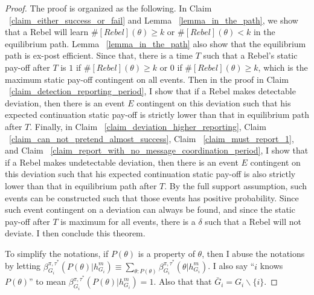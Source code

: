 \documentclass[12pt,letter]{article}
\theoremstyle{definition}
\theoremstyle{remark}
\theoremstyle{claim}
\begin{document}
\begin{proof}
The proof is organized as the following. In Claim ~\ref{claim_either_success_or_fail} and Lemma ~\ref{lemma_in_the_path}, we show that a Rebel will learn $\#[Rebel](\theta)\geq k$ or $\#[Rebel](\theta)< k$ in the equilibrium path. Lemma ~\ref{lemma_in_the_path} also show that the equilibrium path is ex-post efficient. Since that, there is a time $T$ such that a Rebel's static pay-off after $T$ is $1$ if $\#[Rebel](\theta)\geq k$ or $0$ if $\#[Rebel](\theta)\geq k$, which is the maximum static pay-off contingent on all events. Then in the proof in Claim ~\ref{claim_detection_reporting_period}, I show that if a Rebel makes detectable deviation, then there is an event $E$ contingent on this deviation such that his expected continuation static pay-off is strictly lower than that in equilibrium path after $T$. Finally, in Claim ~\ref{claim_deviation_higher_reporting}, Claim ~\ref{claim_can_not_pretend_almost_success}, Claim ~\ref{claim_must_report_1}, and Claim ~\ref{claim_report_with_no_message_coordination_period}, I show that if a Rebel makes undetectable deviation, then there is an event $E$ contingent on this deviation such that his expected continuation static pay-off is also strictly lower than that in equilibrium path after $T$. By the full support assumption, such events can be constructed such that those events has positive probability. Since such event contingent on a deviation can always be found, and since the static pay-off after $T$ is maximum for all events, there is a $\delta$ such that a Rebel will not deviate. I then conclude this theorem.

To simplify the notations, if $P(\theta)$ is a property of $\theta$, then I abuse the notations by letting $\beta^{\pi,\tau^*}_{G_i}(P(\theta)|h^{m}_{G_i})\equiv \sum_{\theta:P(\theta)}\beta^{\pi,\tau^*}_{G_i}(\theta|h^{m}_{G_i})$. I also say ``$i$ knows $P(\theta)$'' to mean $\beta^{\pi,\tau^*}_{G_i}(P(\theta)|h^{m}_{G_i})=1$. Also that that $\bar{G}_i=G_i\backslash \{i\}$.





\end{proof}
\end{document}
